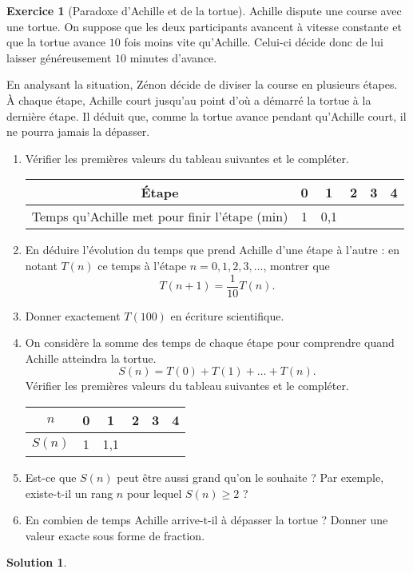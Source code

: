 \documentclass[12pt]{paper}
\theoremstyle{plain}
\newtheorem*{sol}{Solution}
\theoremstyle{definition}
\newtheorem{ex}{Exercice}
\newcommand{\exe}[2]{
		\begin{ex} #1  \end{ex}
		\begin{sol} #2 \end{sol}
	}
\newcommand{\exe}[2]{
		\begin{ex} #1  \end{ex}
	}
\begin{document}
\exe{[Paradoxe d'Achille et de la tortue]
	Achille dispute une course avec une tortue. On suppose que les deux participants avancent à vitesse constante et que la tortue avance $10$ fois moins vite qu'Achille.
	Celui-ci décide donc de lui laisser généreusement $10$ minutes d'avance.

	En analysant la situation, Zénon décide de diviser la course en plusieurs étapes.
	À chaque étape, Achille court jusqu'au point d'où a démarré la tortue à la dernière étape.
	Il déduit que, comme la tortue avance pendant qu'Achille court, il ne pourra jamais la dépasser.

	\begin{enumerate}
		\item Vérifier les premières valeurs du tableau suivantes et le compléter.
			\begin{center}
			\begin{tabular}{|c|c|c|c|c|c|}\hline
				Étape & 0 & 1 & 2 & 3 & 4 \\ \hline
				Temps qu'Achille met pour finir l'étape (min) & 1 & 0,1 & & & \\ \hline
			\end{tabular}
			\end{center}
		\item En déduire l'évolution du temps que prend Achille d'une étape à l'autre :
		en notant $T(n)$ ce temps à l'étape $n=0, 1, 2, 3,\dots$, montrer que
			\[ T(n+1) = \dfrac1{10} T(n). \]
		\item Donner exactement $T(100)$ en écriture scientifique.
		\item On considère la somme des temps de chaque étape pour comprendre quand Achille atteindra la tortue.
			\[ S(n) = T(0) + T(1) + \dots + T(n). \]
		Vérifier les premières valeurs du tableau suivantes et le compléter.
			\begin{center}
			\begin{tabular}{|c|c|c|c|c|c|}\hline
				$n$ & 0 & 1 & 2 & 3 & 4 \\ \hline
				$S(n)$ & 1 & 1,1 & & &  \\ \hline
			\end{tabular}
			\end{center}
		\item Est-ce que $S(n)$ peut être aussi grand qu'on le souhaite ? Par exemple, existe-t-il un rang $n$ pour lequel $S(n) \geq 2$ ?
		\item En combien de temps Achille arrive-t-il à dépasser la tortue ? Donner une valeur exacte sous forme de fraction.
	\end{enumerate}
}{}
\end{document}
